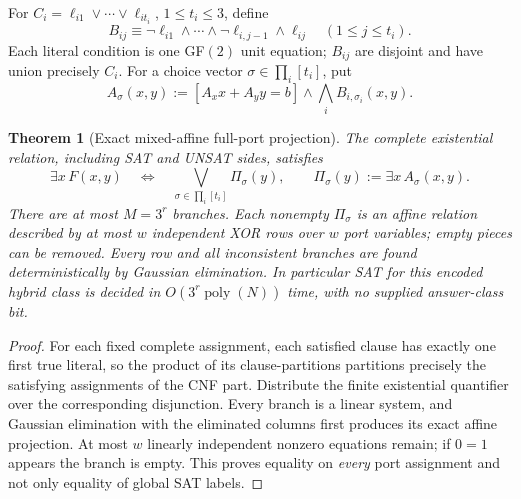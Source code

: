\documentclass[11pt]{article}
\newtheorem{theorem}{Theorem}
\begin{document}
For $C_i=\ell_{i1}\vee\cdots\vee\ell_{it_i}$, $1\le t_i\le3$, define
\[
 B_{ij}\equiv\neg\ell_{i1}\wedge\cdots\wedge\neg\ell_{i,j-1}\wedge\ell_{ij}
 \quad (1\le j\le t_i).
\]
Each literal condition is one GF$(2)$ unit equation; $B_{ij}$ are disjoint and have union precisely $C_i$. For a choice vector $\sigma\in\prod_i[t_i]$, put
\[
 A_\sigma(x,y):=[A_xx+A_yy=b]\wedge\bigwedge_i B_{i,\sigma_i}(x,y).
\]
\begin{theorem}[Exact mixed-affine full-port projection]
The complete existential relation, including SAT and UNSAT sides, satisfies
\[
 \boxed{\exists x\,F(x,y)\quad\Longleftrightarrow\quad
 \bigvee_{\sigma\in\prod_i[t_i]}\Pi_\sigma(y),\qquad
 \Pi_\sigma(y):=\exists x\,A_\sigma(x,y).}
\]
There are at most $M=3^r$ branches. Each nonempty $\Pi_\sigma$ is an affine relation described by at most $w$ independent XOR rows over $w$ port variables; empty pieces can be removed. Every row and all inconsistent branches are found deterministically by Gaussian elimination. In particular SAT for this encoded hybrid class is decided in $O(3^r\operatorname{poly}(N))$ time, with no supplied answer-class bit.
\end{theorem}
\begin{proof}
For each fixed complete assignment, each satisfied clause has exactly one first true literal, so the product of its clause-partitions partitions precisely the satisfying assignments of the CNF part. Distribute the finite existential quantifier over the corresponding disjunction. Every branch is a linear system, and Gaussian elimination with the eliminated columns first produces its exact affine projection. At most $w$ linearly independent nonzero equations remain; if $0=1$ appears the branch is empty. This proves equality on \emph{every} port assignment and not only equality of global SAT labels.
\end{proof}
\end{document}
